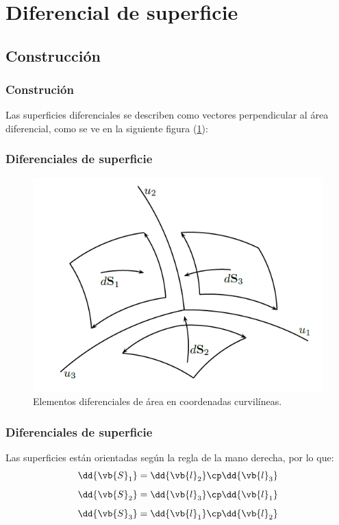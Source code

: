 \section{Diferencial de superficie}
\subsection{Construcción}
\begin{frame}
\frametitle{Construción}
Las superficies diferenciales se describen como vectores perpendicular al área diferencial, como se ve en la siguiente figura (\ref{fig:figura_diferenciales_superficie}):
\end{frame}
\begin{frame}
\frametitle{Diferenciales de superficie}
\begin{figure}[h!]
    \centering
    \includegraphics[scale=0.5]{Imagenes/Diferenciales_Superficie_01.png}
    \caption{Elementos diferenciales de área en coordenadas curvilíneas.}
    \label{fig:figura_diferenciales_superficie}
\end{figure}
\end{frame}
\begin{frame}
\frametitle{Diferenciales de superficie}
Las superficies están orientadas según la regla de la mano derecha, por lo que:
\begin{align*}
\dd{\vb{S}_{1}} &= \dd{\vb{l}_{2}} \cp \dd{\vb{l}_{3}} \\[0.5em] 
\dd{\vb{S}_{2}} &= \dd{\vb{l}_{3}} \cp \dd{\vb{l}_{1}} \\[0.5em]
\dd{\vb{S}_{3}} &= \dd{\vb{l}_{1}} \cp \dd{\vb{l}_{2}}
\end{align*}
\end{frame}
